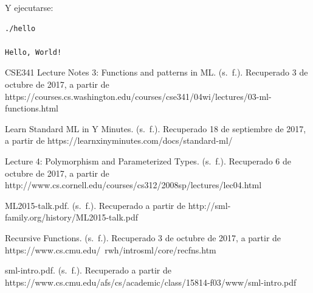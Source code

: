 \documentclass[10pt,journal,compsoc]{IEEEtran}
\begin{document}
Y ejecutarse:

\begin{lstlisting}[language=ML, caption=Ejecuci\'on Hello World]
./hello

Hello, World!
\end{lstlisting}

\begin{thebibliography}{1}
	CSE341 Lecture Notes 3: Functions and patterns in ML. (s. f.). Recuperado 3 de octubre de 2017, a partir de https://courses.cs.washington.edu/courses/cse341/04wi/lectures/03-ml-functions.html
	
	Learn Standard ML in Y Minutes. (s. f.). Recuperado 18 de septiembre de 2017, a partir de https://learnxinyminutes.com/docs/standard-ml/
	
	Lecture 4: Polymorphism and Parameterized Types. (s. f.). Recuperado 6 de octubre de 2017, a partir de http://www.cs.cornell.edu/courses/cs312/2008sp/lectures/lec04.html
	
	ML2015-talk.pdf. (s. f.). Recuperado a partir de http://sml-family.org/history/ML2015-talk.pdf
	
	Recursive Functions. (s. f.). Recuperado 3 de octubre de 2017, a partir de https://www.cs.cmu.edu/~rwh/introsml/core/recfns.htm
	
	sml-intro.pdf. (s. f.). Recuperado a partir de https://www.cs.cmu.edu/afs/cs/academic/class/15814-f03/www/sml-intro.pdf
\end{thebibliography}
\end{document}
